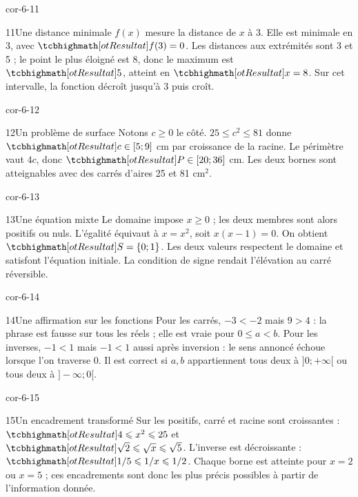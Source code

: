 \begin{blocLivre}{cor-6-11}
\begin{corrige}{11}{Une distance minimale}
$f(x)$ mesure la distance de $x$ à 3. Elle est minimale en 3, avec $\res{f(3)=0}$. Les distances aux extrémités sont 3 et 5 ; le point le plus éloigné est 8, donc le maximum est $\res5$, atteint en $\res{x=8}$. Sur cet intervalle, la fonction décroît jusqu’à 3 puis croît.
\end{corrige}
\end{blocLivre}
\begin{blocLivre}{cor-6-12}
\begin{corrige}{12}{Un problème de surface}
Notons $c\ge0$ le côté. $25\le c^2\le81$ donne $\res{c\in[5;9]}$ cm par croissance de la racine. Le périmètre vaut $4c$, donc $\res{P\in[20;36]}$ cm. Les deux bornes sont atteignables avec des carrés d’aires 25 et 81 cm$^2$.
\end{corrige}
\end{blocLivre}
\begin{blocLivre}{cor-6-13}
\begin{corrige}{13}{Une équation mixte}
Le domaine impose $x\ge0$ ; les deux membres sont alors positifs ou nuls. L’égalité équivaut à $x=x^2$, soit $x(x-1)=0$. On obtient $\res{S=\{0;1\}}$. Les deux valeurs respectent le domaine et satisfont l’équation initiale. La condition de signe rendait l’élévation au carré réversible.
\end{corrige}
\end{blocLivre}
\begin{blocLivre}{cor-6-14}
\begin{corrige}{14}{Une affirmation sur les fonctions}
Pour les carrés, $-3<-2$ mais $9>4$ : la phrase est fausse sur tous les réels ; elle est vraie pour $0\le a<b$. Pour les inverses, $-1<1$ mais $-1<1$ aussi après inversion : le sens annoncé échoue lorsque l’on traverse 0. Il est correct si $a,b$ appartiennent tous deux à $]0;+\infty[$ ou tous deux à $]-\infty;0[$.
\end{corrige}
\end{blocLivre}
\begin{blocLivre}{cor-6-15}
\begin{corrige}{15}{Un encadrement transformé}
Sur les positifs, carré et racine sont croissantes : $\res{4\le x^2\le25}$ et $\res{\sqrt2\le\sqrt x\le\sqrt5}$. L’inverse est décroissante : $\res{1/5\le1/x\le1/2}$. Chaque borne est atteinte pour $x=2$ ou $x=5$ ; ces encadrements sont donc les plus précis possibles à partir de l’information donnée.
\end{corrige}
\end{blocLivre}
